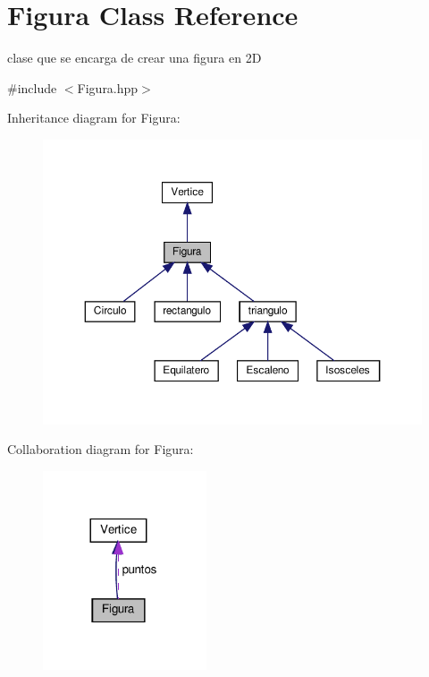 \hypertarget{class_figura}{}\section{Figura Class Reference}
\label{class_figura}


clase que se encarga de crear una figura en 2D  




{\ttfamily \#include $<$Figura.\+hpp$>$}



Inheritance diagram for Figura\+:
\nopagebreak
\begin{figure}[H]
\begin{center}
\leavevmode
\includegraphics[width=350pt]{class_figura__inherit__graph}
\end{center}
\end{figure}


Collaboration diagram for Figura\+:
\nopagebreak
\begin{figure}[H]
\begin{center}
\leavevmode
\includegraphics[width=137pt]{class_figura__coll__graph}
\end{center}
\end{figure}
